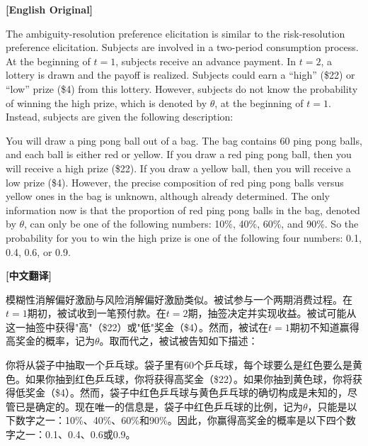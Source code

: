 \documentclass[12pt,a4paper]{ctexart}
\newenvironment{original}{%
  \par\medskip\noindent\textbf{[English Original]}\par\smallskip
  \color{black}\small
}{%
  \par\medskip
}
\newenvironment{translation}{%
  \par\noindent\textbf{[中文翻译]}\par\smallskip
  \color{blue}\small
}{%
  \par\bigskip
}
\theoremstyle{definition}
\theoremstyle{remark}
\begin{document}
\begin{original}
The ambiguity-resolution preference elicitation is similar to the risk-resolution preference elicitation. Subjects are involved in a two-period consumption process. At the beginning of $t=1$, subjects receive an advance payment. In $t=2$, a lottery is drawn and the payoff is realized. Subjects could earn a ``high'' (\$22) or ``low'' prize (\$4) from this lottery. However, subjects do not know the probability of winning the high prize, which is denoted by $\theta$, at the beginning of $t=1$. Instead, subjects are given the following description:

You will draw a ping pong ball out of a bag. The bag contains 60 ping pong balls, and each ball is either red or yellow. If you draw a red ping pong ball, then you will receive a high prize (\$22). If you draw a yellow ball, then you will receive a low prize (\$4). However, the precise composition of red ping pong balls versus yellow ones in the bag is unknown, although already determined. The only information now is that the proportion of red ping pong balls in the bag, denoted by $\theta$, can only be one of the following numbers: 10\%, 40\%, 60\%, and 90\%. So the probability for you to win the high prize is one of the following four numbers: 0.1, 0.4, 0.6, or 0.9.
\end{original}
\begin{translation}
模糊性消解偏好激励与风险消解偏好激励类似。被试参与一个两期消费过程。在$t=1$期初，被试收到一笔预付款。在$t=2$期，抽签决定并实现收益。被试可能从这一抽签中获得"高"（\$22）或"低"奖金（\$4）。然而，被试在$t=1$期初不知道赢得高奖金的概率，记为$\theta$。取而代之，被试被告知如下描述：

你将从袋子中抽取一个乒乓球。袋子里有60个乒乓球，每个球要么是红色要么是黄色。如果你抽到红色乒乓球，你将获得高奖金（\$22）。如果你抽到黄色球，你将获得低奖金（\$4）。然而，袋子中红色乒乓球与黄色乒乓球的确切构成是未知的，尽管已是确定的。现在唯一的信息是，袋子中红色乒乓球的比例，记为$\theta$，只能是以下数字之一：10\%、40\%、60\%和90\%。因此，你赢得高奖金的概率是以下四个数字之一：0.1、0.4、0.6或0.9。
\end{translation}
\end{document}
